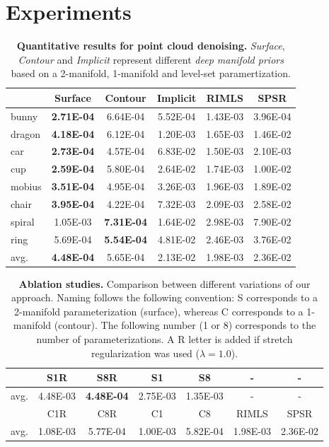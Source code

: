\section{Experiments}\label{sec:experiments}

\begin{table}[t]
\centering
\footnotesize
\tabcolsep=0.11cm
\begin{tabular}{|l|c|c|c||c|c|}
\hline
& Surface & Contour & Implicit & RIMLS\cite{rimls} & SPSR\cite{spsr} \\
\hline
bunny & \textbf{2.71E-04} & 6.64E-04 & 5.52E-04 & 1.43E-03 & 3.96E-04 \\
dragon & \textbf{4.18E-04} & 6.12E-04 & 1.20E-03 & 1.65E-03 & 1.46E-02 \\
car & \textbf{2.73E-04} & 4.57E-04 & 6.83E-02 & 1.50E-03 & 2.10E-03 \\
cup &  \textbf{2.59E-04} & 5.80E-04 & 2.64E-02 & 1.74E-03 & 1.00E-02 \\
mobius &  \textbf{3.51E-04} & 4.95E-04 & 3.26E-03 & 1.96E-03 & 1.89E-02 \\
chair &  \textbf{3.95E-04} & 4.22E-04 & 7.32E-03 & 2.09E-03 & 2.58E-02 \\
spiral &  1.05E-03 & \textbf{7.31E-04} & 1.64E-02 & 2.98E-03 & 7.90E-02 \\
ring &  5.69E-04 & \textbf{5.54E-04}& 4.81E-02 & 2.46E-03 & 3.76E-02 \\
\hline
avg. & \textbf{4.48E-04} & 5.65E-04& 2.13E-02 & 1.98E-03 & 2.36E-02 \\
\hline
\end{tabular}
\vspace{4pt}
\caption{ \small \label{tab:denoising} \textbf{Quantitative results for point cloud denoising.}
\emph{Surface}, \emph{Contour} and \emph{Implicit} represent different \emph{deep manifold priors} based on a 2-manifold, 1-manifold and level-set paramertization.
}
\vspace{-15pt}
\end{table}
\begin{table}[t]
\centering
\scriptsize
\tabcolsep=0.11cm
\begin{tabular}{|l|c|c|c|c||c|c|}
\hline
& S1R & S8R & S1 & S8 & - & - \\
\hline
avg. & 4.48E-03 & \textbf{4.48E-04} & 2.75E-03 & 1.35E-03  & - & - \\
\hline \hline
& C1R & C8R & C1 & C8 & RIMLS\cite{rimls} & SPSR\cite{spsr} \\
\hline
avg. & 1.08E-03 & 5.77E-04 & 1.00E-03 & 5.82E-04 & 1.98E-03 & 2.36E-02 \\
\hline
\end{tabular}
\vspace{4pt}
\caption{ \small \label{tab:ablation} \textbf{Ablation studies.}
Comparison between different variations of our approach.
Naming follows the following convention: S corresponds to a 2-manifold parameterization (surface), whereas C corresponds to a 1-manifold (contour).
The following number (1 or 8) corresponds to the number of parameterizations.
A R letter is added if stretch regularization was used ($\lambda=1.0$).
}
\end{table}

